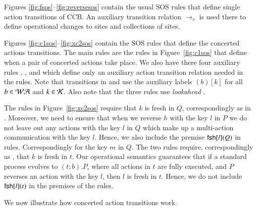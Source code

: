 {Figures  \ref{fig:fsos}--\ref{fig:reversesos} contain the usual SOS rules that define single action transitions of CCB. An auxiliary transition relation $\xrightarrow{}_s$ is used there to define operational changes to sites and collections of sites.  


Figures \ref{fig:c1sos}--\ref{fig:xc2sos} contain the SOS rules that define the concerted actions transitions. 
The main rules are the  rules in Figure~\ref{fig:c1sos} that define when a pair %
of concerted actions take place. 
We also have there four auxiliary rules , ,  and  which 
define only an auxiliary action transition relation needed in the  rules.
Note that transitions in  and  use the auxiliary labels $(b)[k]$ 
for all $b \in \mathcal{WA}$ and $k \in \mathcal{K}$. Also note that the three  rules use \emph{lookahead} \cite{Uli92}.



The rules  in Figure~\ref{fig:xc2sos} require that $k$ is fresh in $Q$,
correspondingly as in . Moreover, we need to ensure that when we reverse $h$ with the key $l$
in $P$ we do not leave out any actions with the key $l$ in $Q$ which make up a multi-action 
communication with the key $l$. Hence, we also include the premise $\mathsf{fsh}[l](Q)$ in  rules. Correspondingly for the key $m$ in $Q$.
The two rules  require, correspondingly as , that $k$ is fresh in $t$.
Our operational semantics guarantees that if a standard process evolves to $(t;b).P$, where all actions in $t$ are fully executed, and
$P$ reverses an action with the key $l$, then $l$ is fresh in $t$. Hence, we do not include $\mathsf{fsh}[l](t)$
in the premises of the  rules.

We now illustrate how concerted action transitions work.

}
